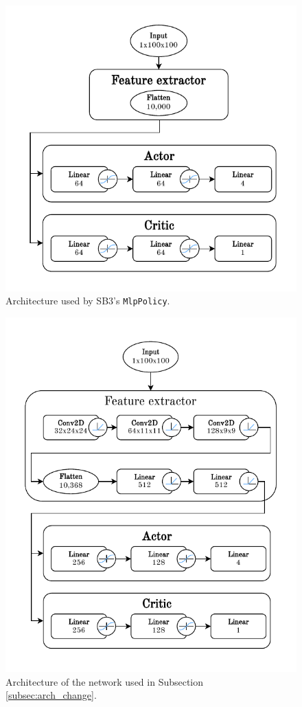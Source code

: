 \documentclass[
  digital,     %
  oneside,     %
  nosansbold,  %
  nocolorbold, %
  lof,         %
  lot,         %
]{fithesis4}
\begin{document}
\begin{figure}
    \includegraphics[width=1\linewidth]{diagrams/mlp_arch.pdf}
    \caption{Architecture used by SB3's \texttt{MlpPolicy}.}
    \label{fig:mlp_policy}
\end{figure}

\begin{figure}
    \includegraphics[width=1\linewidth]{diagrams/bigger_net_arch.pdf}
    \caption{Architecture of the network used in Subsection \ref{subsec:arch_change}.}
    \label{fig:bigger_net_policy}
\end{figure}
\end{document}
